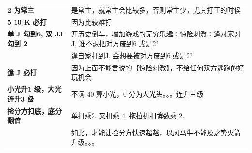 \documentclass[9pt, b5paper]{article}
\begin{document}
\begin{center}
\begin{tabular}{ll}
\textbf{2 为常主} & 是常主，就常主会比较多，否则常主少，尤其打王的时候\\
\textbf{5 10 K 必打} & 因为比较难打\\
\textbf{单 J 勾到6, 双 JJ 勾到 2} & 开历史倒车，增加游戏的无穷乐趣：惊险刺激：逢对家对J, 谁不想把对方废到6 或是2?\\
 & 逢自家打到J, 会想要被对方废到6 或是2?\\
\textbf{逢 J 必打} & 因为上面不能言说的【惊险刺激】，不给任何双方逃跑的好玩机会\\
\textbf{小光升1 级，大光连升3 级} & 不满 40 算小光，0 分为大光头。。。连升三级\\
\textbf{捡分方扣底，底分翻倍} & 单扣乘2, 又扣乘 4, 拖拉机扣牌数乘 2.\\
 & 如此，才能让捡分方快速超越，以风马牛不能及之势火箭升级。。。\\
\end{tabular}
\end{center}
\end{document}
